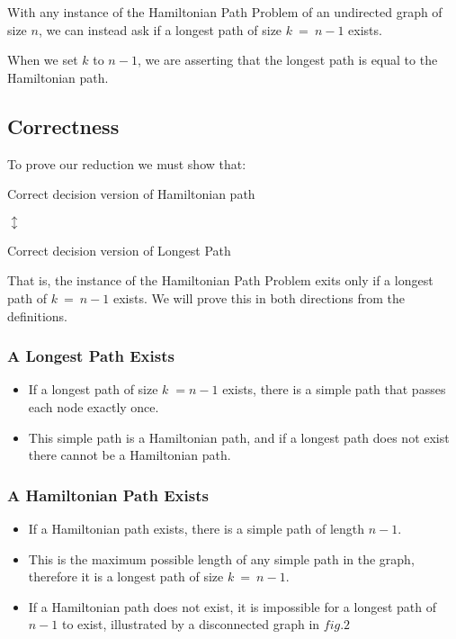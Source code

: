 \documentclass[a4paper,11pt]{article}
\begin{document}
With any instance of the Hamiltonian Path Problem of an undirected graph of size
$n$, we can instead ask if a longest path of size $k\:=\:n-1$ exists.

When we set $k$ to $n-1$, we are asserting that the longest path is equal to the
Hamiltonian path.

\subsection{Correctness}

To prove our reduction we must show that:

\begin{center}

    Correct decision version of Hamiltonian path

    $\updownarrow$

    Correct decision version of Longest Path

\end{center}

That is, the instance of the Hamiltonian Path Problem exits only if a longest
path of $k\:=\:n-1$ exists. We will prove this in both directions from the
definitions.

\subsubsection{A Longest Path Exists}

\begin{itemize}
    \item If a longest path of size $k\;=n-1$ exists, there is a simple path
          that passes each node exactly once.
    \item This simple path is a Hamiltonian path, and if a longest path does not
          exist there cannot be a Hamiltonian path.
\end{itemize}
\pagebreak

\subsubsection{A Hamiltonian Path Exists}

\begin{itemize}
    \item If a Hamiltonian path exists, there is a simple path of length $n-1$.
    \item This is the maximum possible length of any simple path in the graph,
          therefore it is a longest path of size $k\:=\:n-1$.
    \item If a Hamiltonian path does not exist, it is impossible for a longest
          path of $n-1$ to exist, illustrated by a disconnected graph in $fig.2$
\end{itemize}
\end{document}
